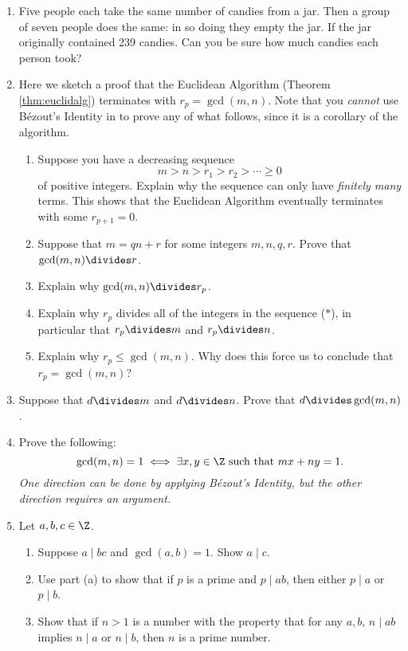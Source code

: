 \begin{enumerate}
  \item Five people each take the same number of candies from a jar. Then a group of seven people does the same: in so doing they empty the jar. If the jar originally contained 239 candies. Can you be sure how much candies each person took?

  \item Here we sketch a proof that the Euclidean Algorithm (Theorem \ref{thm:euclidalg}) terminates with $r_p=\gcd(m,n)$. Note that you \emph{cannot} use Bézout's Identity in to prove any of what follows, since it is a corollary of the algorithm.
  \begin{enumerate}
    \item Suppose you have a decreasing sequence
    \[m>n>r_1>r_2>\cdots\geq 0\tag*{($\ast$)}\]
    of positive integers. Explain why the sequence can only have \emph{finitely many} terms. This shows that the Euclidean Algorithm eventually terminates with some $r_{p+1}=0$.
  	\item Suppose that $m=qn+r$ for some integers $m,n,q,r$. Prove that $\gcd(m,n)\divides r$.
  	\item Explain why $\gcd(m,n)\divides r_p$.
  	\item Explain why $r_p$ divides all of the integers in the sequence ($\ast$), in particular that $r_p\divides m$ and $r_p\divides n$.
  	\item Explain why $r_p\le\gcd(m,n)$. Why does this force us to conclude that $r_p=\gcd(m,n)$?
  \end{enumerate}
  
  \item Suppose that $d\divides m$ and $d\divides n$. Prove that $d\divides\gcd(m,n)$.

  \item\label{ex:gcd1} Prove the following:
  \[\gcd(m,n)=1\iff\exists x,y\in\Z\text{ such that }mx+ny=1.\]
  \emph{One direction can be done by applying Bézout's Identity, but the other direction requires an argument.}
  
    \item Let $a,b,c \in \Z$. 
    \begin{enumerate}
        \item Suppose $a \mid bc$ and $\gcd(a,b) = 1$. Show $a \mid c$.
        \item Use part (a) to show that if $p$ is a prime and $p \mid ab$, then either $p \mid a$ or $p \mid b$.
        \item Show that if $n > 1$ is a number with the property that for any $a,b$, $n \mid ab$ implies $n \mid a$ or $n \mid b$, then $n$ is a prime number.
    \end{enumerate}
    

\end{enumerate}
